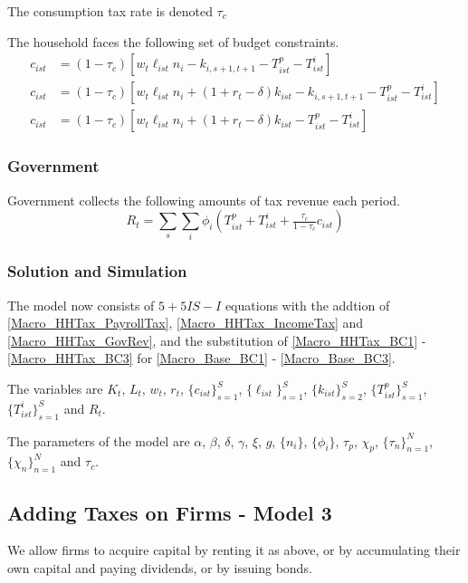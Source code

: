 \documentclass[letterpaper,12pt]{article}
\theoremstyle{definition}
\numberwithin{equation}{section}
\begin{document}
\begin{spacing}{1.5}
      The consumption tax rate is denoted $\tau_c$

      The household faces the following set of budget constraints.
      \begin{align}
      c_{ist} & = (1-\tau_c)\left[w_t \ell_{ist} n_i - k_{i,s+1,t+1} - T^p_{ist} - T^i_{ist} \right] \label{Macro_HHTax_BC1}\\
      c_{ist} & = (1-\tau_c)\left[w_t \ell_{ist} n_i + (1+r_t-\delta) k_{ist} - k_{i,s+1,t+1} - T^p_{ist} - T^i_{ist} \right] \label{Macro_HHTax_BC2}\\
      c_{ist} & = (1-\tau_c)\left[w_t \ell_{ist} n_i + (1+r_t-\delta) k_{ist} - T^p_{ist} - T^i_{ist} \right] \label{Macro_HHTax_BC3}
      \end{align}

    \subsubsection{Government}
      Government collects the following amounts of tax revenue each period.
      \begin{equation} \label{Macro_HHTax_GovRev}
      R_t = \sum_s \sum_i \phi_i \left( T^p_{ist} + T^i_{ist} + \tfrac{\tau_c}{1-\tau_c} c_{ist} \right)
      \end{equation}

    \subsubsection{Solution and Simulation}
      The model now consists of $5 + 5IS - I$ equations with the addtion of \eqref{Macro_HHTax_PayrollTax}, \eqref{Macro_HHTax_IncomeTax} and \eqref{Macro_HHTax_GovRev}, and the substitution of \eqref{Macro_HHTax_BC1} - \eqref{Macro_HHTax_BC3} for \eqref{Macro_Base_BC1} - \eqref{Macro_Base_BC3}.

      The variables are $K_t$, $L_t$, $w_t$, $r_t$, $\{c_{ist}\}_{s=1}^S$, $\{\ell_{ist}\}_{s=1}^S$, $\{k_{ist}\}_{s=2}^S$, $\{T^p_{ist}\}_{s=1}^S$, $\{T^i_{ist}\}_{s=1}^S$ and $R_t$.

      The parameters of the model are $\alpha$, $\beta$, $\delta$, $\gamma$, $\xi$, $g$, $\{n_i\}$, $\{\phi_i\}$, $\tau_p$, $\chi_p$, $\{\tau_n\}_{n=1}^N$, $\{\chi_n\}_{n=1}^N$ and $\tau_c$.

    \newpage

  \subsection{Adding Taxes on Firms - Model 3}\label{SubSec_Macro_CorpTax}
    We allow firms to acquire capital by renting it as above, or by accumulating their own capital and paying dividends, or by issuing bonds.


\end{spacing}
\end{document}
